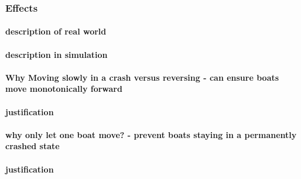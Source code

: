       \subsubsection{Effects}
        \paragraph{description of real world}
        \paragraph{description in simulation}
        \paragraph{Why Moving slowly in a crash versus reversing - can ensure boats move monotonically forward}
        \paragraph{justification}
        \paragraph{why only let one boat move? - prevent boats staying in a permanently crashed state}
        \paragraph{justification}
  

